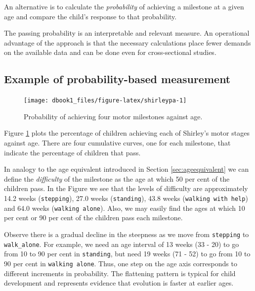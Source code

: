 \documentclass[
]{book}
\begin{document}
An alternative is to calculate the \emph{probability} of achieving a milestone at a given age and compare the child's response to that probability.

The passing probability is an interpretable and relevant measure. An operational advantage of the approach is that the necessary calculations place fewer demands on the available data and can be done even for cross-sectional studies.

\hypertarget{example-of-probability-based-measurement}{%
\subsection{Example of probability-based measurement}\label{example-of-probability-based-measurement}}

\begin{figure}

{\centering \texttt{[image: dbook1\_files/figure-latex/shirleypa-1]} 

}

\caption{Probability of achieving four motor milestones against age.}\label{fig:shirleypa}
\end{figure}



Figure \ref{fig:shirleypa} plots the percentage of children achieving each of Shirley's motor stages against age. There are four cumulative curves, one for each milestone, that indicate the percentage of children that pass.

In analogy to the age equivalent introduced in Section \ref{sec:ageequivalent} we can define the \emph{difficulty} of the milestone as the age at which 50 per cent of the children pass. In the Figure we see that the levels of difficulty are approximately 14.2 weeks (\texttt{stepping}), 27.0 weeks (\texttt{standing}), 43.8 weeks (\texttt{walking\ with\ help}) and 64.0 weeks (\texttt{walking\ alone}). Also, we may easily find the ages at which 10 per cent or 90 per cent of the children pass each milestone.

Observe there is a gradual decline in the steepness as we move from \texttt{stepping} to \texttt{walk\_alone}. For example, we need an age interval of 13 weeks (33 - 20) to go from 10 to 90 per cent in \texttt{standing}, but need 19 weeks (71 - 52) to go from 10 to 90 per cent in \texttt{walking\ alone}. Thus, one step on the age axis corresponds to different increments in probability. The flattening pattern is typical for child development and represents evidence that evolution is faster at earlier ages.
\end{document}
